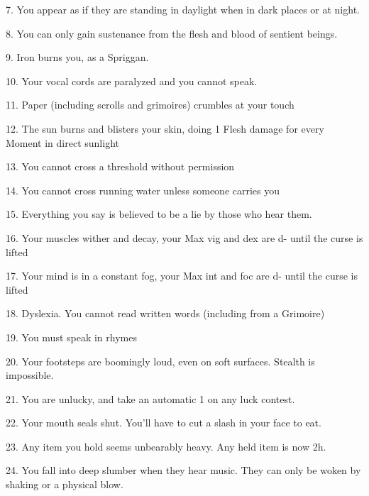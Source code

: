 7. You appear as if they are standing in daylight when in dark places or at night.



8. You can only gain sustenance from the flesh and blood of sentient beings.



9. Iron burns you, as a Spriggan.




10. Your vocal cords are paralyzed and you cannot speak.



11. Paper (including scrolls and grimoires) crumbles at your touch



12. The sun burns and blisters your skin, doing 1 Flesh damage for every Moment in direct sunlight



13. You cannot cross a threshold without permission



14. You cannot cross running water unless someone carries you



15. Everything you say is believed to be a lie by those who hear them.



16. Your muscles wither and decay, your Max {vig} and {dex} are {d-} until the curse is lifted



17. Your mind is in a constant fog, your Max {int} and {foc} are {d-} until the curse is lifted



18. Dyslexia.  You cannot read written words (including from a Grimoire)



19. You must speak in rhymes



20. Your footsteps are boomingly loud, even on soft surfaces. Stealth is impossible.


21. You are unlucky, and take an automatic 1 on any luck contest.



22. Your mouth seals shut. You'll have to cut a slash in your face to eat. 


23. Any item you hold seems unbearably heavy.  Any held item is now 2h.




24. You fall into deep slumber when they hear music. They can only be woken by shaking or a physical blow.

